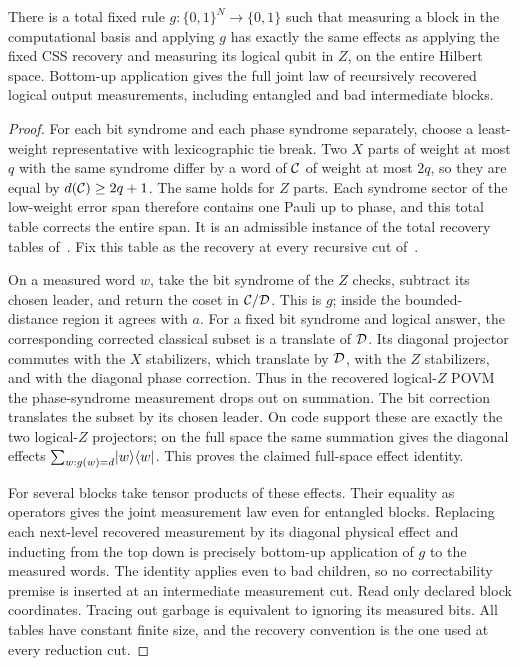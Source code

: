\begin{lemma}\label{lem:readout}
There is a total fixed rule $g:\{0,1\}^N\to\{0,1\}$ such that measuring a block in the computational basis and applying $g$ has exactly the same effects as applying the fixed CSS recovery and measuring its logical qubit in $Z$, on the entire Hilbert space. Bottom-up application gives the full joint law of recursively recovered logical output measurements, including entangled and bad intermediate blocks.
\end{lemma}
\begin{proof}
For each bit syndrome and each phase syndrome separately, choose a least-weight representative with lexicographic tie break. Two $X$ parts of weight at most $q$ with the same syndrome differ by a word of $\mathcal C$ of weight at most $2q$, so they are equal by $d(\mathcal C)\ge2q+1$. The same holds for $Z$ parts. Each syndrome sector of the low-weight error span therefore contains one Pauli up to phase, and this total table corrects the entire span. It is an admissible instance of the total recovery tables of~\cite[Lemma~5.1]{DMMemory2026}. Fix this table as the recovery at every recursive cut of~\cite[Lemma~13.1]{DMMemory2026}.

On a measured word $w$, take the bit syndrome of the $Z$ checks, subtract its chosen leader, and return the coset in $\mathcal C/\mathcal D$. This is $g$; inside the bounded-distance region it agrees with $a$. For a fixed bit syndrome and logical answer, the corresponding corrected classical subset is a translate of $\mathcal D$. Its diagonal projector commutes with the $X$ stabilizers, which translate by $\mathcal D$, with the $Z$ stabilizers, and with the diagonal phase correction. Thus in the recovered logical-$Z$ POVM the phase-syndrome measurement drops out on summation. The bit correction translates the subset by its chosen leader. On code support these are exactly the two logical-$Z$ projectors; on the full space the same summation gives the diagonal effects $\sum_{w:g(w)=d}\lvert w\rangle\langle w\rvert$. This proves the claimed full-space effect identity.

For several blocks take tensor products of these effects. Their equality as operators gives the joint measurement law even for entangled blocks. Replacing each next-level recovered measurement by its diagonal physical effect and inducting from the top down is precisely bottom-up application of $g$ to the measured words. The identity applies even to bad children, so no correctability premise is inserted at an intermediate measurement cut. Read only declared block coordinates. Tracing out garbage is equivalent to ignoring its measured bits. All tables have constant finite size, and the recovery convention is the one used at every reduction cut.
\end{proof}
